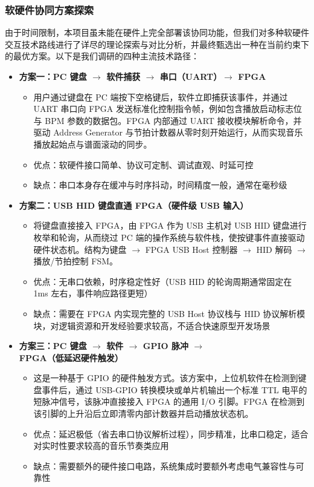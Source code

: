 \documentclass[12pt, a4paper]{article}
\begin{document}
\subsubsection{软硬件协同方案探索}
由于时间限制，本项目虽未能在硬件上完全部署该协同功能，但我们对多种软硬件交互技术路线进行了详尽的理论探索与对比分析，并最终甄选出一种在当前约束下的最优方案。以下是我们调研的四种主流技术路径：
\begin{itemize}
    \item \textbf{方案一：PC 键盘 $\rightarrow$ 软件捕获 $\rightarrow$ 串口（UART）$\rightarrow$ FPGA}
    \begin{itemize}
        \item 用户通过键盘在 PC 端按下空格键后，软件立即捕获该事件，并通过 UART 串口向 FPGA 发送标准化控制指令帧，例如包含播放启动标志位与 BPM 参数的数据包。FPGA 内部通过 UART 接收模块解析命令，并驱动 Address Generator 与节拍计数器从零时刻开始运行，从而实现音乐播放起始点与谱面滚动的同步。
        \item 优点：软硬件接口简单、协议可定制、调试直观、时延可控
        \item 缺点：串口本身存在缓冲与时序抖动，时间精度一般，通常在毫秒级
    \end{itemize}

    \item \textbf{方案二：USB HID 键盘直通 FPGA（硬件级 USB 输入）}
    \begin{itemize}
        \item 将键盘直接接入 FPGA，由 FPGA 作为 USB 主机对 USB HID 键盘进行枚举和轮询，从而绕过 PC 端的操作系统与软件栈，使按键事件直接驱动硬件状态机。结构为键盘 $\rightarrow$ FPGA USB Host 控制器 $\rightarrow$ HID 解码 $\rightarrow$ 播放/节拍控制 FSM。
        \item 优点：无串口依赖，时序稳定性好（USB HID 的轮询周期通常固定在 1ms 左右，事件响应路径更短）
        \item 缺点：需要在 FPGA 内实现完整的 USB Host 协议栈与 HID 协议解析模块，对逻辑资源和开发经验要求较高，不适合快速原型开发场景
    \end{itemize}

    \item \textbf{方案三：PC 键盘 $\rightarrow$ 软件 $\rightarrow$ GPIO 脉冲 $\rightarrow$ FPGA（低延迟硬件触发）}
    \begin{itemize}
        \item 这是一种基于 GPIO 的硬件触发方式。该方案中，上位机软件在检测到键盘事件后，通过 USB-GPIO 转换模块或单片机输出一个标准 TTL 电平的短脉冲信号，该脉冲直接接入 FPGA 的通用 I/O 引脚。FPGA 在检测到该引脚的上升沿后立即清零内部计数器并启动播放状态机。
        \item 优点：延迟极低（省去串口协议解析过程），同步精准，比串口稳定，适合对实时性要求较高的音乐节奏类应用
        \item 缺点：需要额外的硬件接口电路，系统集成时要额外考虑电气兼容性与可靠性
    \end{itemize}


\end{itemize}
\end{document}
